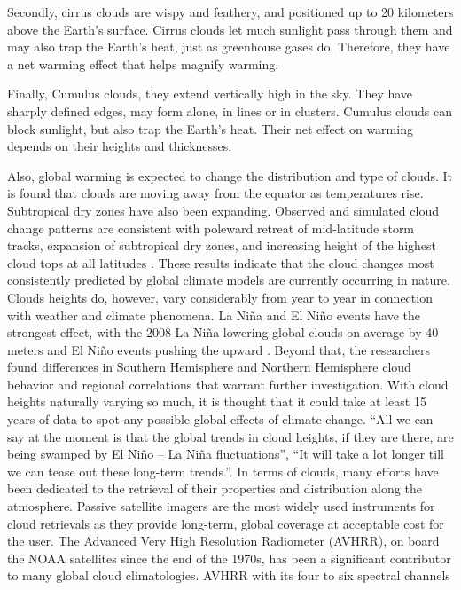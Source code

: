 \documentclass{scrartcl}
\begin{document}
Secondly, cirrus clouds are wispy and feathery, and positioned up to 20 kilometers
above the Earth’s surface. Cirrus clouds let much sunlight pass through them and
may also trap the Earth’s heat, just as greenhouse gases do. Therefore, they have
 a net warming effect that helps magnify warming.

Finally, Cumulus clouds, they extend vertically high in the sky. They have
sharply defined edges, may form alone, in lines or in clusters. Cumulus clouds
can block sunlight, but also trap the Earth’s heat. Their net effect on warming
depends on their heights and thicknesses.

Also, global warming is expected to change the distribution and type of clouds.
It is found that clouds are moving away from the equator as temperatures rise.
Subtropical dry zones have also been expanding. Observed and simulated cloud
change patterns are consistent with poleward retreat of mid-latitude storm
 tracks, expansion of subtropical dry zones, and increasing height of the
 highest cloud tops at all latitudes \citep{clouds_high}. These results indicate that the
 cloud changes most consistently predicted by global climate models are currently occurring in
 nature. Clouds heights do, however, vary considerably from year to year
 in connection with weather and
climate phenomena. La Niña and El Niño events have the strongest effect, with
the 2008 La Niña lowering global clouds on average by 40 meters and El Niño
events pushing the upward \citep{lelli}. Beyond that, the researchers found differences
in Southern Hemisphere and Northern Hemisphere cloud behavior and regional
correlations that warrant further investigation. With cloud heights naturally
varying so much, it is thought \citep{clouds_soon} that it could take at least 15 years of data
to spot any possible global effects of climate change. “All we can say at the
moment is that the global trends in cloud heights, if they are there, are being
swamped by El Niño – La Niña fluctuations”, “It will take a lot longer till we
can tease out these long-term trends.”. In terms of clouds, many efforts have
been dedicated to the retrieval of their properties and distribution along the
atmosphere. Passive satellite imagers are the most widely used instruments for
cloud retrievals as they provide long-term, global coverage at acceptable cost
for the user. The Advanced Very High Resolution Radiometer (AVHRR), on board the
NOAA satellites since the end of the 1970s, has been a significant contributor
to many global cloud climatologies. AVHRR with its four to six spectral channels
\end{document}
